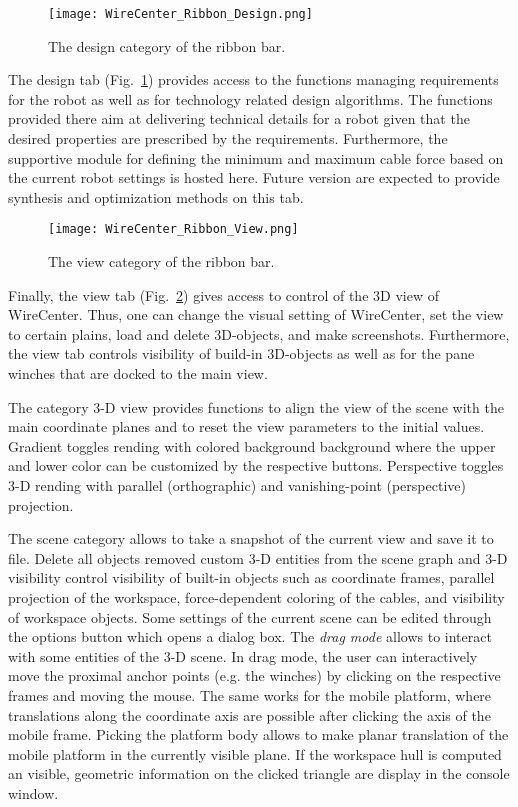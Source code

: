 \documentclass[11pt,a4paper,onepage,openany]{book}
\begin{document}
\begin{figure}[t]
  \centering
  \texttt{[image: WireCenter\_Ribbon\_Design.png]}
  \caption{The design category of the ribbon bar.}\label{fig:WireCenterRibbonDesign}
\end{figure}

The design tab (Fig.~\ref{fig:WireCenterRibbonDesign}) provides access to the functions managing requirements for the robot as well as for technology related design algorithms. The functions provided there aim at delivering technical details for a robot given that the desired properties are prescribed by the requirements. Furthermore, the supportive module for defining the minimum and maximum cable force based on the current robot settings is hosted here. Future version are expected to provide synthesis and optimization methods on this tab.

\begin{figure}[t]
  \centering
  \texttt{[image: WireCenter\_Ribbon\_View.png]}
  \caption{The view category of the ribbon bar.}\label{fig:WireCenterRibbonView}
\end{figure}

Finally, the view tab (Fig.~\ref{fig:WireCenterRibbonView}) gives access to
control of the 3D view of WireCenter. Thus, one can change the visual setting
of WireCenter, set the view to certain plains, load and delete 3D-objects, and
make screenshots. Furthermore, the view tab controls visibility of build-in
3D-objects as well as for the pane winches that are docked to the main view.

The category 3-D view provides functions to align the view of the scene with
the main coordinate planes and to reset the view parameters to the initial
values. Gradient toggles rending with colored background background where the
upper and lower color can be customized by the respective buttons. Perspective
toggles 3-D rending with parallel (orthographic) and vanishing-point (perspective) projection.

The scene category allows to take a snapshot of the current view and save it
to file. Delete all objects removed custom 3-D entities from the scene graph
and 3-D visibility control visibility of built-in objects such as coordinate
frames, parallel projection of the workspace, force-dependent coloring of the
cables, and visibility of workspace objects. Some settings of the current scene
can be edited through the options button which opens a dialog box. The
\emph{drag mode} allows to interact with some entities of the 3-D scene. In drag
mode, the user can interactively move the proximal anchor points (e.g. the winches)
by clicking on the respective frames and moving the mouse. The same works for the
mobile platform, where translations along the coordinate axis are possible after
clicking the axis of the mobile frame. Picking the platform body allows to make
planar translation of the mobile platform in the currently visible plane. If the
workspace hull is computed an visible, geometric information on the clicked
triangle are display in the console window.
\end{document}
